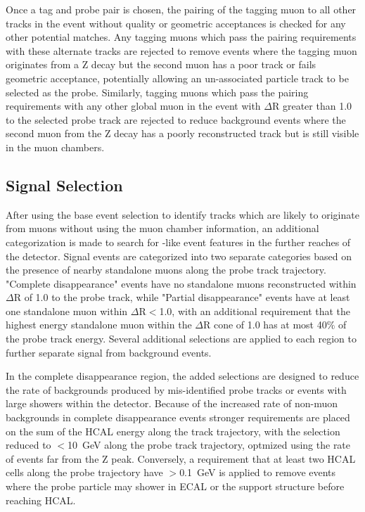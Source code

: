 Once a tag and probe pair is chosen, the pairing of the tagging muon to all other tracks in the event without quality or geometric acceptances is checked for any other potential matches.
Any tagging muons which pass the pairing requirements with these alternate tracks are rejected to remove events where the tagging muon originates from a Z decay but the second muon has a poor track or fails geometric acceptance, potentially allowing an un-associated particle track to be selected as the probe.
Similarly, tagging muons which pass the pairing requirements with any other global muon in the event with $\Delta$R greater than 1.0 to the selected probe track are rejected to reduce background events where the second muon from the Z decay has a poorly reconstructed track but is still visible in the muon chambers.

\subsection{Signal Selection}
After using the base event selection to identify tracks which are likely to originate from muons without using the muon chamber information, an additional categorization is made to search for \dbrem-like event features in the further reaches of the detector.
Signal events are categorized into two separate categories based on the presence of nearby standalone muons along the probe track trajectory.
"Complete disappearance" events have no standalone muons reconstructed within $\Delta$R of 1.0 to the probe track, while "Partial disappearance" events have at least one standalone muon within $\Delta$R$<$1.0, with an additional requirement that the highest energy standalone muon within the $\Delta$R cone of 1.0 has at most 40$\%$ of the probe track energy.
Several additional selections are applied to each region to further separate signal from background events.

In the complete disappearance region, the added selections are designed to reduce the rate of backgrounds produced by mis-identified probe tracks or events with large showers within the detector.
Because of the increased rate of non-muon backgrounds in complete disappearance events stronger requirements are placed on the sum of the HCAL energy along the track trajectory, with the selection reduced to $<$\SI{10}{\giga\eV} along the probe track trajectory, optmized using the rate of events far from the Z peak. 
Conversely, a requirement that at least two HCAL cells along the probe trajectory have $>$\SI{0.1}{\giga\eV} is applied to remove events where the probe particle may shower in ECAL or the support structure before reaching HCAL.

